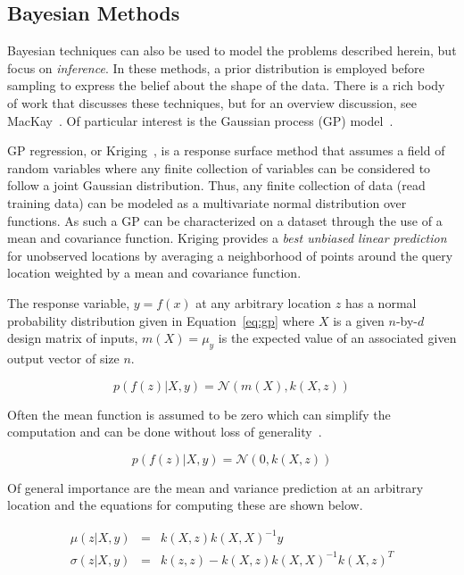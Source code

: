 \subsection{Bayesian Methods}

Bayesian techniques can also be used to model the problems described herein, but focus on \emph{inference}.
%
In these methods, a prior distribution is employed before sampling to express the belief about the shape of the data.
%
There is a rich body of work that discusses these techniques, but for an overview discussion, see MacKay~\cite{MacKay1992b}.
%
Of particular interest is the Gaussian process (GP) model~\cite{RasmussenWilliams2006}.

GP regression, or Kriging~\cite{Stein1999}, is a response surface method that assumes a field of random variables where any finite collection of variables can be considered to follow a joint Gaussian distribution.
%
Thus, any finite collection of data (read training data) can be modeled as a multivariate normal distribution over functions.
%
As such a GP can be characterized on a dataset through the use of a mean and covariance function.
%
Kriging provides a \emph{best unbiased linear prediction} for unobserved locations by averaging a neighborhood of points around the query location weighted by a mean and covariance function.

The response variable, $y=f(x)$ at any arbitrary location $z$ has a normal probability distribution given in Equation~\ref{eq:gp} where $X$ is a given $n$-by-$d$ design matrix of inputs, $m(X) = \mu_y$ is the expected value of an associated given output vector of size $n$.

\begin{equation}
p(f(z)|X,y) = \mathcal{N}(m(X),k(X,z))
\label{eq:gp}
\end{equation}

Often the mean function is assumed to be zero which can simplify the computation and can be done without loss of generality~\cite{Seeger2004}.

\begin{equation}
p(f(z)|X,y) = \mathcal{N}(0,k(X,z))
\label{eq:gpSimple}
\end{equation}

Of general importance are the mean and variance prediction at an arbitrary location and the equations for computing these are shown below.

\begin{eqnarray}
\mu(z|X,y) & = & k(X,z)k(X,X)^{-1}y\\
\sigma(z|X,y) & = & k(z,z) - k(X,z)k(X,X)^{-1}k(X,z)^T
\end{eqnarray}

